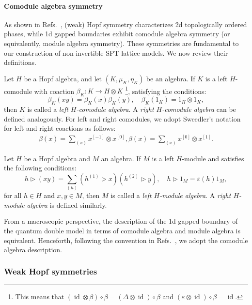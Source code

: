 \documentclass[a4paper,11pt]{article}
\theoremstyle{theorem}
\theoremstyle{remark}
\newcommand{\id}{\operatorname{id}}
\begin{document}
\paragraph{Comodule algebra symmetry}
As shown in Refs.~\cite{jia2023boundary,Jia2023weak,jia2024weakTube}, (weak) Hopf symmetry characterizes 2d topologically ordered phases, while 1d gapped boundaries exhibit comodule algebra symmetry (or equivalently, module algebra symmetry). These symmetries are fundamental to our construction of non-invertible SPT lattice models. We now review their definitions.


Let $H$ be a Hopf algebra, and let $(K, \mu_K, \eta_K)$ be an algebra. If $K$ is a left $H$-comodule with coaction $\beta_K: K \to H \otimes K$ \footnote{This means that $(\id \otimes \beta) \circ \beta = (\Delta \otimes \id )\circ \beta $ and $(\varepsilon \otimes \id)\circ \beta =\id$.}, satisfying the conditions:
\begin{equation}
    \beta_K(xy) = \beta_K(x) \beta_K(y), \quad \beta_K(1_K) = 1_H \otimes 1_K,
\end{equation}
then $K$ is called a \emph{left $H$-comodule algebra}. A \emph{right $H$-comodule algebra} can be defined analogously.
For left and right comodules, we adopt Sweedler's notation for left and right coactions as follows:
\begin{align}
    \beta(x) = \sum_{(x)} x^{[-1]} \otimes x^{[0]}, 
    \beta(x) = \sum_{(x)} x^{[0]} \otimes x^{[1]}.
\end{align}

Let $H$ be a Hopf algebra and $M$ an algebra. If $M$ is a left $H$-module and satisfies the following conditions:
\begin{equation}
    h \triangleright (xy) = \sum_{(h)} (h^{(1)} \triangleright x)(h^{(2)} \triangleright y), \quad h \triangleright 1_M = \varepsilon(h) 1_M,
\end{equation}
for all $h \in H$ and $x, y \in M$, then $M$ is called a \emph{left $H$-module algebra}. A \emph{right $H$-module algebra} is defined similarly.

From a macroscopic perspective, the description of the 1d gapped boundary of the quantum double model in terms of comodule algebra and module algebra is equivalent. Henceforth, following the convention in Refs.~\cite{jia2023boundary,Jia2023weak,jia2024weakTube}, we adopt the comodule algebra description.




\subsubsection{Weak Hopf symmetries}
\end{document}
